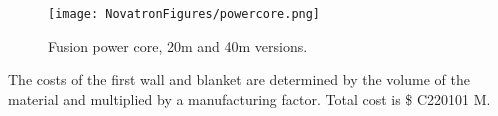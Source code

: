 





\begin{figure}[h!]
    \centering
    \texttt{[image: NovatronFigures/powercore.png]}
    \caption{ Fusion power core, 20m and 40m versions.}
    \label{fig:cad}
\end{figure}

The costs of the first wall and blanket are determined by the volume of the material and multiplied by a manufacturing factor. Total cost is \$ C220101 M.

